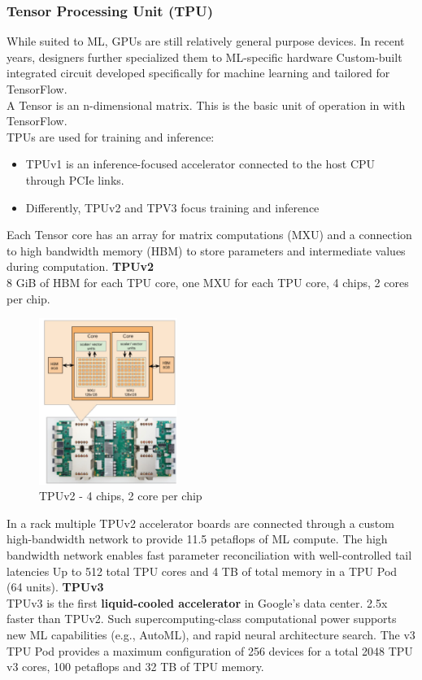 \documentclass[10pt, oneside]{article}
\begin{document}
\subsubsection{Tensor Processing Unit (TPU)}
While suited to ML, GPUs are still relatively general purpose devices. In recent years, designers further specialized them to ML-specific hardware Custom-built integrated circuit developed specifically for machine learning and tailored for TensorFlow.\\A Tensor is an n-dimensional matrix. This is the basic unit of operation in with TensorFlow.\\TPUs are used for training and inference:
\begin{itemize}
    \item TPUv1 is an inference-focused accelerator connected to the host CPU through PCIe links.
    \item Differently, TPUv2 and TPV3 focus training and inference
\end{itemize}
Each Tensor core has an array for matrix computations (MXU) and a connection to high bandwidth memory (HBM) to store parameters and intermediate values during computation.
\textbf{TPUv2}
\\
8 GiB of HBM for each TPU core, one MXU for each TPU core, 4 chips, 2 cores per chip.
\begin{figure}[H]
    \begin{center}
    \includegraphics[width=0.4\textwidth]{img/img10.png}
    \caption{TPUv2 - 4 chips, 2 core per chip}
    \label{fig:TPUv2 - 4 chips, 2 core per chip}
    \end{center}
\end{figure}
In a rack multiple TPUv2 accelerator boards are connected through a custom high-bandwidth network to provide 11.5 petaflops of ML compute. The high bandwidth network enables fast parameter reconciliation with well-controlled tail latencies Up to 512 total TPU cores and 4 TB of total memory in a TPU Pod (64 units).
\textbf{TPUv3}
\\
TPUv3 is the first \textbf{liquid-cooled accelerator}
in Google’s data center. 2.5x faster than TPUv2. Such supercomputing-class computational power supports new ML capabilities (e.g., AutoML), and rapid neural architecture search. The v3 TPU Pod provides a maximum configuration of 256 devices for a total 2048 TPU v3 cores, 100 petaflops and 32 TB of TPU memory.
\end{document}
